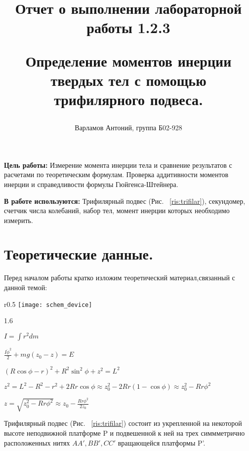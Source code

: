 \documentclass[12pt,a4paper]{article}
\begin{document}
\title{
Отчет о выполнении лабораторной работы 1.2.3

Определение моментов инерции твердых тел с помощью трифилярного подвеса.
\author{Варламов Антоний, группа Б02-928}
}

\maketitle

\newpage

\textbf{Цель работы:} Измерение момента инерции тела и сравнение результатов с расчетами по теоретическим формулам. Проверка аддитивности моментов инерции и справедливости формулы Гюйгенса-Штейнера.


\textbf{В работе используются:} Трифилярный подвес (Рис. ~\ref{ris:trifilar}), секундомер, счетчик числа колебаний, набор тел, момент инерции которых необходимо измерить.

\section{Теоретические данные.}

	Перед началом работы кратко изложим теоретический материал,связанный с данной темой:
	\begin{wrapfigure}[10]{r}{0.5\textwidth}
   		\texttt{[image: schem\_device]}%
    	\caption{Трифилярный подвес}
    	\label{ris:trifilar}
	\end{wrapfigure}


	\begin{flushleft}
		\begin{spacing}{1.6}

			$ I = \int r^2 dm $


			$ \frac{I\ddot{\phi}^2}{2} + mg(z_{0} - z) = E $


			$ (R\cos\phi - r)^2 + R^2\sin^2\phi + z^2 = L^2 $


			$ z^2 = L^2 - R^2 - r^2 + 2Rr\cos\phi \approx z^2_{0} - 2Rr(1 - \cos\phi) \approx z^2_{0} - Rr\phi^2 $


			$ z = \sqrt{z^2_{0} - Rr\phi^2} \approx z_{0} - \frac{Rr\phi^2}{2z_{0}} $

		\end{spacing}
	\end{flushleft}

		Трифилярный подвес (Рис. ~\ref{ris:trifilar}) состоит из укрепленной на некоторой высоте 				неподвижной 	платформе P и подвешенной к ней на трех симмметрично расположенных нитях $ AA', BB', 		CC' $ вращающейся платформы P'.
\end{document}
